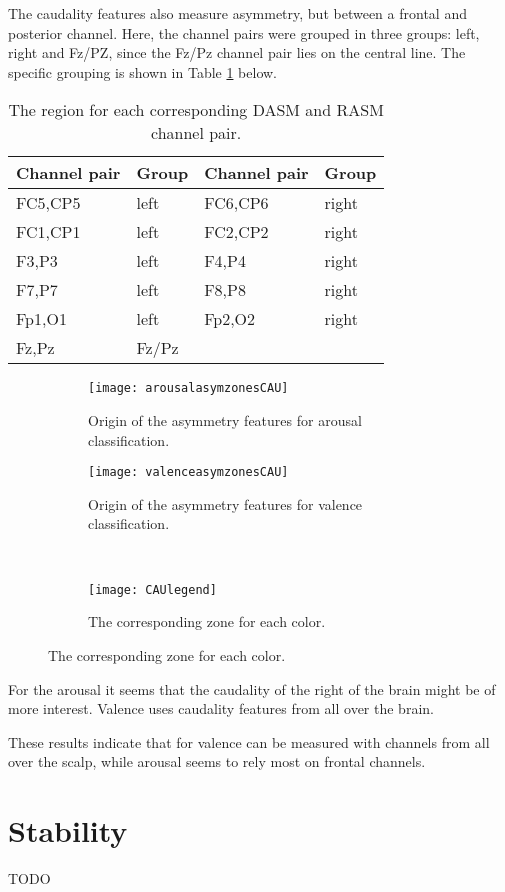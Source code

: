 \npar

The caudality features also measure asymmetry, but between a frontal and posterior channel. Here, the channel pairs were grouped in three groups: left, right and Fz/PZ, since the Fz/Pz channel pair lies on the central line. The specific grouping is shown in Table \ref{CAUgroupTable} below.

\begin{table}[H]
\centering
\caption{The region for each corresponding DASM and RASM channel pair\label{CAUgroupTable}.}
\begin{tabular}{ll|ll}
\textbf{Channel pair} & \textbf{Group} & \textbf{Channel pair} & \textbf{Group} \\ \hline
FC5,CP5               & left           & FC6,CP6               & right          \\
FC1,CP1               & left           & FC2,CP2               & right          \\
F3,P3                 & left           & F4,P4                 & right          \\
F7,P7                 & left           & F8,P8                 & right          \\
Fp1,O1                & left           & Fp2,O2                & right          \\
Fz,Pz                 & Fz/Pz          &                       &                \\
\end{tabular}
\end{table}

\begin{figure}[H]
\centering
  \begin{subfigure}[b]{.4\textwidth}
    \texttt{[image: arousalasymzonesCAU]}
    \caption{Origin of the asymmetry features for arousal classification.\label{arousalasymzonesCAU}}
  \end{subfigure}
\hfill
  \begin{subfigure}[b]{.4\textwidth}
    \texttt{[image: valenceasymzonesCAU]}
    \caption{Origin of the asymmetry features for valence classification.\label{valenceasymzonesCAU}}
  \end{subfigure}
\\
  \begin{subfigure}[b]{.5\textwidth}
    \texttt{[image: CAUlegend]}
    \caption{The corresponding zone for each color.\label{CAUlegend}}
  \end{subfigure}
\end{figure}

For the arousal it seems that the caudality of the right of the brain might be of more interest. Valence uses caudality features from all over the brain.

\npar

These results indicate that for valence can be measured with channels from all over the scalp, while arousal seems to rely most on frontal channels.

\section{Stability}
TODO

